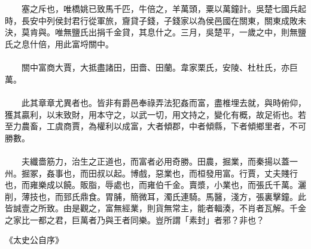 \\\\
　　塞之斥也，唯橋姚已致馬千匹，牛倍之，羊萬頭，粟以萬鐘計。吳楚七國兵起時，長安中列侯封君行從軍旅，齎貸子錢，子錢家以為侯邑國在關東，關東成敗未決，莫肯與。唯無鹽氏出捐千金貸，其息什之。三月，吳楚平，一歲之中，則無鹽氏之息什倍，用此富埒關中。
\\\\
　　關中富商大賈，大抵盡諸田，田嗇、田蘭。韋家栗氏，安陵、杜杜氏，亦巨萬。
\\\\
　　此其章章尤異者也。皆非有爵邑奉祿弄法犯姦而富，盡椎埋去就，與時俯仰，獲其贏利，以末致財，用本守之，以武一切，用文持之，變化有概，故足術也。若至力農畜，工虞商賈，為權利以成富，大者傾郡，中者傾縣，下者傾鄉里者，不可勝數。
\\\\
　　夫纖嗇筋力，治生之正道也，而富者必用奇勝。田農，掘業，而秦揚以蓋一州。掘冢，姦事也，而田叔以起。博戲，惡業也，而桓發用富。行賈，丈夫賤行也，而雍樂成以饒。販脂，辱處也，而雍伯千金。賣漿，小業也，而張氏千萬。灑削，薄技也，而郅氏鼎食。胃脯，簡微耳，濁氏連騎。馬醫，淺方，張裏擊鐘。此皆誠壹之所致。由是觀之，富無經業，則貨無常主，能者輻湊，不肖者瓦解。千金之家比一都之君，巨萬者乃與王者同樂。豈所謂「素封」者邪？非也？

《太史公自序》

